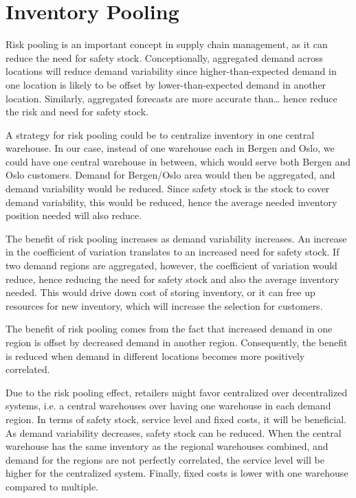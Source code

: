 \documentclass[../../main.tex]{subfiles}
\begin{document}

\section{Inventory Pooling}

Risk pooling is an important concept in supply chain management, as it can reduce the need for safety stock. Conceptionally, aggregated demand across locations will reduce demand variability since higher-than-expected demand in one location is likely to be offset by lower-than-expected demand in another location. Similarly, aggregated forecasts are more accurate than…   hence reduce the risk and need for safety stock.

A strategy for risk pooling could be to centralize inventory in one central warehouse. In our case, instead of one warehouse each in Bergen and Oslo, we could have one central warehouse in between, which would serve both Bergen and Oslo customers. Demand for Bergen/Oslo area would then be aggregated, and demand variability would be reduced. Since safety stock is the stock to cover demand variability, this would be reduced, hence the average needed inventory position needed will also reduce.

The benefit of risk pooling increases as demand variability increases. An increase in the coefficient of variation translates to an increased need for safety stock. If two demand regions are aggregated, however, the coefficient of variation would reduce, hence reducing the need for safety stock and also the average inventory needed. This would drive down cost of storing inventory, or it can free up resources for new inventory, which will increase the selection for customers.

The benefit of risk pooling comes from the fact that increased demand in one region is offset by decreased demand in another region. Consequently, the benefit is reduced when demand in different locations becomes more positively correlated. 

Due to the risk pooling effect, retailers might favor centralized over decentralized systems, i.e. a central warehouses over having one warehouse in each demand region. In terms of safety stock, service level and fixed costs, it will be beneficial. As demand variability decreases, safety stock can be reduced. When the central warehouse has the same inventory as the regional warehouses combined, and demand for the regions are not perfectly correlated, the service level will be higher for the centralized system. Finally, fixed costs is lower with one warehouse compared to multiple.
\end{document}
